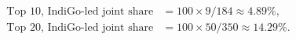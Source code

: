 \begin{align*}
\text{Top 10, IndiGo-led joint share} &= 100\times9/184 \approx 4.89\%, \\
\text{Top 20, IndiGo-led joint share} &= 100\times50/350 \approx 14.29\%.
\end{align*}
